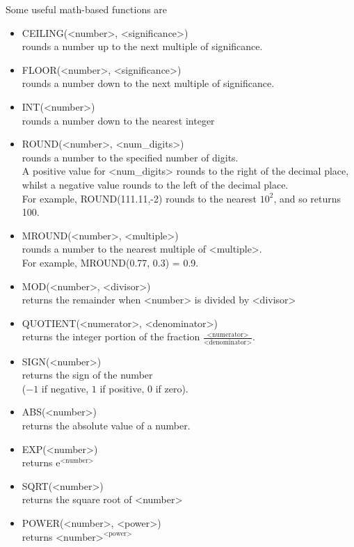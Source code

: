 \documentclass[10pt, openany, twocolumn]{book}
\begin{document}
Some useful math-based functions are
\begin{itemize}
    \item CEILING(<number>, <significance>)\\ rounds a number up to the next multiple of significance.
    \item FLOOR(<number>, <significance>)\\ rounds a number down to the next multiple of significance.
    \item INT(<number>)\\ rounds a number down to the nearest integer
    \item ROUND(<number>, <num\_digits>) \\ rounds a number to the specified number of digits. \\
    
    A positive value for <num\_digits> rounds to the right of the decimal place, whilst a negative value rounds to the left of the decimal place. \\
    
    For example, ROUND(111.11,-2) rounds to the nearest $10^2$, and so returns 100.
    \item MROUND(<number>, <multiple>) \\ rounds a number to the nearest multiple of <multiple>. \\
    
    For example, MROUND(0.77, 0.3) = 0.9. 
    \item MOD(<number>, <divisor>)\\ returns the remainder when <number> is divided by <divisor>
    \item QUOTIENT(<numerator>, <denominator>)\\ returns the integer portion of the fraction $\frac{\text{<numerator>}}{\text{<denominator>}}$.
    \item SIGN(<number>) \\ returns the sign of the number \\ ($-1$ if negative, $1$ if positive, $0$ if zero).
    \item ABS(<number>) \\ returns the absolute value of a number.
    \item EXP(<number>) \\ returns $\text{e}^\text{<number>}$
    \item SQRT(<number>) \\ returns the square root of <number>
    \item POWER(<number>, <power>)\\ returns $\text{<number>}^\text{<power>}$
\end{itemize}
\end{document}
